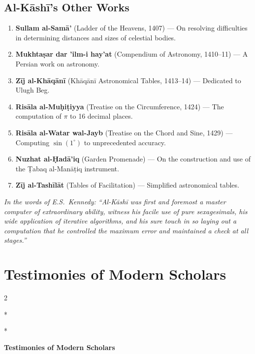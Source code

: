 \documentclass[11pt,a4paper]{article}
\newcommand{\cnote}[1]{\textcolor{notecolor}{\textit{#1}}}
\newcommand{\ar}[1]{{\arabicfont\beginR #1\endR}}
\newenvironment{bilingual}{%
  \vspace{0.3em}%
  \begin{paracol}{2}%
}{%
  \end{paracol}%
  \vspace{0.3em}%
}
\begin{document}
\subsection{Al-K\=ash\=i's Other Works}

\begin{enumerate}[label=\arabic*.]
  \item \textbf{Sullam al-Sam\=a'} (Ladder of the Heavens, 1407) --- On
  resolving difficulties in determining distances and sizes of celestial
  bodies.
  \item \textbf{Mukhta\d{s}ar dar 'ilm-i hay'at} (Compendium of Astronomy,
  1410--11) --- A Persian work on astronomy.
  \item \textbf{Z\=ij al-Kh\=aq\=an\=i} (Kh\=aq\=an\=i Astronomical Tables,
  1413--14) --- Dedicated to Ulugh Beg.
  \item \textbf{Ris\=ala al-Mu\d{h}i\d{t}iyya} (Treatise on the Circumference,
  1424) --- The computation of $\pi$ to 16 decimal places.
  \item \textbf{Ris\=ala al-Watar wal-Jayb} (Treatise on the Chord and
  Sine, 1429) --- Computing $\sin(1^\circ)$ to unprecedented accuracy.
  \item \textbf{Nuzhat al-\d{H}ad\=a'iq} (Garden Promenade) --- On the
  construction and use of the \d{T}abaq al-Man\=a\d{t}iq instrument.
  \item \textbf{Z\=ij al-Tash\=il\=at} (Tables of Facilitation) ---
  Simplified astronomical tables.
\end{enumerate}

\cnote{In the words of E.S.\ Kennedy: ``Al-K\=ash\=i was first and foremost
a master computer of extraordinary ability, witness his facile use of
pure sexagesimals, his wide application of iterative algorithms, and his
sure touch in so laying out a computation that he controlled the maximum error
and maintained a check at all stages.''}
\clearpage

\section{Testimonies of Modern Scholars}
\label{app:scholars}

\begin{bilingual}
\switchcolumn[0]*
\begin{center}
\textbf{\Large\color{chapcolor}\ar{شهادات العلماء المعاصرين}}
\end{center}
\switchcolumn[1]*
\begin{center}
\textbf{\Large\color{chapcolor}Testimonies of Modern Scholars}
\end{center}
\end{bilingual}
\end{document}
